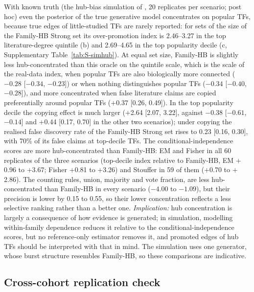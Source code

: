 \documentclass[11pt,a4paper]{article}
\begin{document}
With known truth (the hub-bias simulation of , 20 replicates per scenario; post hoc) even the posterior of the true generative model concentrates on popular TFs, because true edges of little-studied TFs are rarely reported: for sets of the size of the Family-HB Strong set its over-promotion index is 2.46--3.27 in the top literature-degree quintile (b) and 2.69--4.65 in the top popularity decile (c, Supplementary Table~\ref{tab:S-simhub}).
At equal set size, Family-HB is slightly less hub-concentrated than this oracle on the quintile scale, which is the scale of the real-data index, when popular TFs are also biologically more connected (\ensuremath{-0.28} [\ensuremath{-0.34}, \ensuremath{-0.23}]) or when nothing distinguishes popular TFs (\ensuremath{-0.34} [\ensuremath{-0.40}, \ensuremath{-0.28}]), and more concentrated when false literature claims are copied preferentially around popular TFs ($+$0.37 [0.26, 0.49]).
In the top popularity decile the copying effect is much larger ($+$2.64 [2.07, 3.22], against \ensuremath{-0.38} [\ensuremath{-0.61}, \ensuremath{-0.14}] and $+$0.44 [0.17, 0.70] in the other two scenarios); under copying the realised false discovery rate of the Family-HB Strong set rises to 0.23 [0.16, 0.30], with 70\% of its false claims at top-decile TFs.
The conditional-independence scores are more hub-concentrated than Family-HB: EM and Fisher in all 60 replicates of the three scenarios (top-decile index relative to Family-HB, EM $+$0.96 to $+$3.67; Fisher $+$0.81 to $+$3.26) and Stouffer in 59 of them ($+$0.70 to $+$2.86).
The counting rules, union, majority and vote fraction, are less hub-concentrated than Family-HB in every scenario (\ensuremath{-4.00} to \ensuremath{-1.09}), but their precision is lower by 0.15 to 0.55, so their lower concentration reflects a less selective ranking rather than a better one.
\emph{Implication:} hub concentration is largely a consequence of how evidence is generated; in simulation, modelling within-family dependence reduces it relative to the conditional-independence scores, but no reference-only estimator removes it, and promoted edges of hub TFs should be interpreted with that in mind. The simulation uses one generator, whose burst structure resembles Family-HB, so these comparisons are indicative.


\subsection{Cross-cohort replication check}\label{sec:res-replication}
\end{document}
